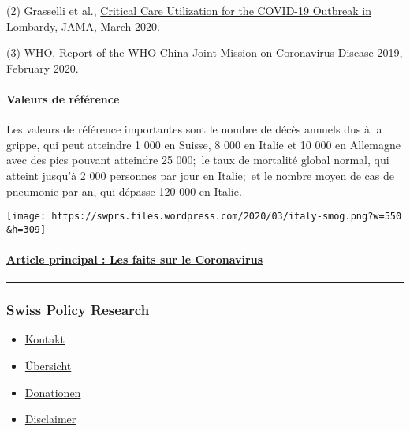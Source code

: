 (2) Grasselli et al.,
\href{https://jamanetwork.com/journals/jama/fullarticle/2763188}{Critical
Care Utilization for the COVID-19 Outbreak in Lombardy}, JAMA, March
2020.

(3) WHO,
\href{https://www.who.int/docs/default-source/coronaviruse/who-china-joint-mission-on-covid-19-final-report.pdf}{Report
of the WHO-China Joint Mission on Coronavirus Disease 2019}, February
2020.

\hypertarget{valeurs-de-ruxe9fuxe9rence}{%
\paragraph{Valeurs de référence}\label{valeurs-de-ruxe9fuxe9rence}}

Les valeurs de référence importantes sont le nombre de décès annuels dus
à la grippe, qui peut atteindre 1 000 en Suisse, 8 000 en Italie et 10
000 en Allemagne avec des pics pouvant atteindre 25 000;~le taux de
mortalité global normal, qui atteint jusqu'à 2 000 personnes par jour en
Italie;~et le nombre moyen de cas de pneumonie par an, qui dépasse 120
000 en Italie.

\texttt{[image: https://swprs.files.wordpress.com/2020/03/italy-smog.png?w=550\\\&h=309]}

\hypertarget{article-principal--les-faits-sur-le-coronavirus-1}{%
\paragraph{\texorpdfstring{\href{https://swprs.org/coronavirus-un-medecin-suisse-parle/}{Article
principal : Les faits sur le
Coronavirus}}{Article principal : Les faits sur le Coronavirus}}\label{article-principal--les-faits-sur-le-coronavirus-1}}

\begin{center}\rule{0.5\linewidth}{\linethickness}\end{center}

\hypertarget{swiss-policy-research}{%
\subsubsection{Swiss Policy Research}\label{swiss-policy-research}}

\begin{itemize}
\tightlist
\item
  \href{https://swprs.org/kontakt/}{Kontakt}
\item
  \href{https://swprs.org/uebersicht/}{Übersicht}
\item
  \href{https://swprs.org/donationen/}{Donationen}
\item
  \href{https://swprs.org/disclaimer/}{Disclaimer}
\end{itemize}

